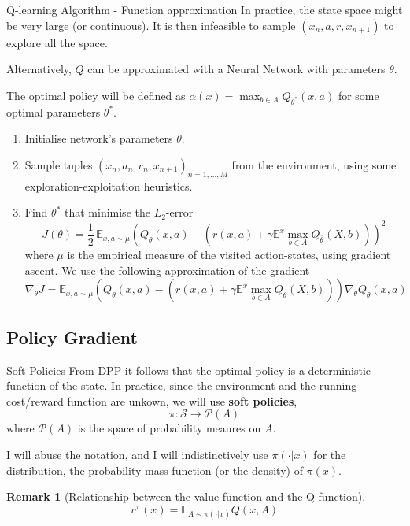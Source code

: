 \documentclass[usenames,handout,aspectratio=169]{beamer}
\newtheorem{remark}{Remark}[theorem]
\begin{document}
\begin{frame}{Q-learning Algorithm - Function approximation}
In practice, the state space might be very large (or continuous). It is then infeasible to sample $(x_n, a, r, x_{n+1})$ to explore all the space. 

Alternatively, $Q$ can be approximated with a Neural Network with parameters $\theta$. 

The optimal policy will be defined as $\alpha(x) = \max_{b\in A} Q_{\theta^*}(x,a)$ for some optimal parameters $\theta^*$.
\begin{enumerate}
\item Initialise network's parameters $\theta$.
\item Sample tuples $(x_n, a_n, r_n, x_{n+1})_{n=1,...,M}$ from the environment, using some exploration-exploitation heuristics. 
\item Find $\theta^*$ that minimise the $L_2$-error
\[
J(\theta) = \frac1{2}\, \mathbb E_{x,a\sim \mu} \left(Q_\theta(x,a) - (r(x,a) + \gamma \mathbb E^x \max_{b\in A} Q_{\bar \theta}(X,b)) \right)^2
\] 
where $\mu$ is the empirical measure of the visited  action-states,
using gradient ascent. We use the following approximation of the gradient
\[
\nabla_\theta J = \mathbb E_{x,a \sim \mu}\left(Q_\theta(x,a) - (r(x,a) + \gamma \mathbb E^x \max_{b\in A} Q_{\bar \theta}(X,b)) \right)\nabla_\theta Q_\theta(x,a)
\] 
\end{enumerate}
\end{frame}

\subsection{Policy Gradient}
\begin{frame}{Soft Policies}
From DPP it follows that the optimal policy is a deterministic function of the state. In practice, since the environment and the running cost/reward function are unkown, we will use \textbf{soft policies},
\[
\pi: \mathcal S \rightarrow \mathcal P(A)
\]
where $\mathcal P(A)$ is the space of probability meaures on $A$. 

I will abuse the notation, and I will indistinctively use  $\pi(\cdot | x)$ for the distribution, the probability mass function (or the density) of $\pi(x)$.

\begin{remark}[Relationship between the value function and the Q-function]
\[
v^\pi(x) = \mathbb E_{A\sim \pi(\cdot|x)} Q(x,A)
\]
\end{remark}


\end{frame}
\end{document}
